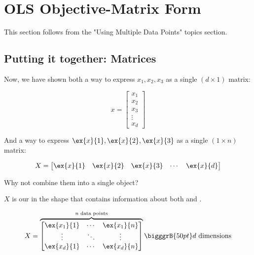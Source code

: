 \section*{OLS Objective-Matrix Form}
   
This section follows from the "Using Multiple Data Points" topics section.
    
    \subsection*{Putting it together: Matrices}
    
        Now, we have shown both a way to express $x_1, x_2, x_3$ as a single $(d \times 1)$ matrix:
        
        \begin{equation}
            x = 
            \begin{bmatrix}
              x_1 \\ x_2 \\ x_3 \\ \vdots \\ x_d
            \end{bmatrix}
        \end{equation}
        
        And a way to express $\ex{x}{1}, \ex{x}{2}, \ex{x}{3}$ as a single $(1 \times n)$ matrix:
        
        \begin{equation}
            X =
                \begin{bmatrix}
                  \ex{x}{1} & \ex{x}{2} & \ex{x}{3} & \cdots & \ex{x}{d}
                \end{bmatrix}
        \end{equation}
        
        Why not combine them into a single object?\\
        
        \begin{kequation}
            $X$ is our  in the shape  that contains information about both  and .
            
            \begin{equation}
                    X = 
                        \overbrace{
                            \begin{bmatrix}
                                \ex{x_1}{1} & \cdots  & \ex{x_1}{n} \\
                                \vdots      & \ddots & \vdots      \\
                                \ex{x_d}{1} & \cdots  & \ex{x_d}{n}
                            \end{bmatrix}
                            }^{ n \text{ data points}}
                        \bigggrB{50pt} d \text{ dimensions}
            \end{equation}

        \end{kequation}
        
